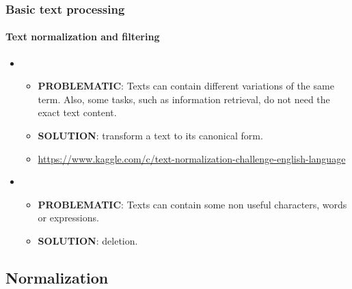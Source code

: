 \documentclass[xcolor=table]{beamer}
\begin{document}
\begin{frame}
\frametitle{Basic text processing}
\framesubtitle{Text normalization and filtering}

\begin{itemize}
	\item {}
	\begin{itemize}
		\item \textbf{PROBLEMATIC}: Texts can contain different variations of the same term. 
		Also, some tasks, such as information retrieval, do not need the exact text content.
		\item \textbf{SOLUTION}: transform a text to its canonical form.
		\item \url{https://www.kaggle.com/c/text-normalization-challenge-english-language}
	\end{itemize}
	\item {}
	\begin{itemize}
		\item \textbf{PROBLEMATIC}: Texts can contain some non useful characters, words or expressions.
		\item \textbf{SOLUTION}: deletion.
	\end{itemize}
\end{itemize}

\end{frame}

\subsection{Normalization}
\end{document}
